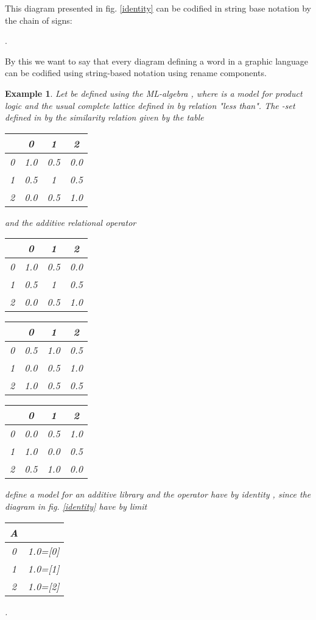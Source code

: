 \documentclass[oribibl]{llncs}
\newtheorem{exam}{Example}
\begin{document}
This diagram presented in fig. \ref{identity} can be codified in string base notation by the chain of signs:

  
  .

By this we want to say that every diagram defining a word in a graphic language can be codified using string-based notation using rename components.

\begin{exam}
Let  be defined using the ML-algebra  , where     is a model for product logic and  the usual complete lattice defined in  by relation "less than". The -set defined in  by the similarity relation given by the table
\begin{center}
\small
\begin{tabular}{c|ccc}
   & 0 & 1 & 2 \\
  \hline
  0 & 1.0 & 0.5 & 0.0 \\
  1 & 0.5 & 1 & 0.5 \\
  2 & 0.0 & 0.5 & 1.0 \\
\end{tabular}
\end{center}
and the additive relational operator
\begin{center}
\small
\begin{tabular}{c|ccc}
   & 0 & 1 & 2 \\
  \hline
  0 & 1.0 & 0.5 & 0.0 \\
  1 & 0.5 & 1 & 0.5 \\
  2 & 0.0 & 0.5 & 1.0 \\
\end{tabular}
\begin{tabular}{c|ccc}
   & 0 & 1 & 2 \\
  \hline
  0 & 0.5 & 1.0 & 0.5 \\
  1 & 0.0 & 0.5 & 1.0 \\
  2 & 1.0 & 0.5 & 0.5 \\
\end{tabular}
\begin{tabular}{c|ccc}
   & 0 & 1 & 2 \\
  \hline
  0 & 0.0 & 0.5 & 1.0 \\
  1 & 1.0 & 0.0 & 0.5 \\
  2 & 0.5 & 1.0 & 0.0 \\
\end{tabular}
\end{center}
define a model for an additive library and the operator have by identity , since the diagram in fig. \ref{identity} have by limit
\begin{center}
\small
\begin{tabular}{c|c}
  A &  \\
  \hline
  0 & 1.0=[0] \\
  1 & 1.0=[1] \\
  2 & 1.0=[2] \\
\end{tabular}
.
\end{center}
\end{exam}
\end{document}
